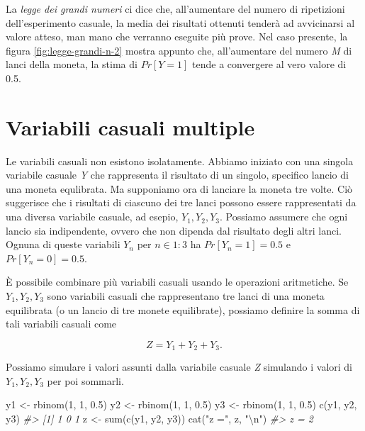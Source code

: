 \documentclass[
  11pt,
]{krantz}
\makeatletter
\newenvironment{Shaded}{\begin{snugshade}}{\end{snugshade}}
\newcommand{\CommentTok}[1]{\textcolor[rgb]{0.37,0.37,0.37}{\textit{#1}}}
\newcommand{\DecValTok}[1]{\textcolor[rgb]{0.06,0.06,0.06}{#1}}
\newcommand{\FloatTok}[1]{\textcolor[rgb]{0.06,0.06,0.06}{#1}}
\newcommand{\FunctionTok}[1]{\textcolor[rgb]{0,0,0}{#1}}
\newcommand{\NormalTok}[1]{#1}
\newcommand{\OtherTok}[1]{\textcolor[rgb]{0.37,0.37,0.37}{#1}}
\newcommand{\SpecialCharTok}[1]{\textcolor[rgb]{0,0,0}{#1}}
\newcommand{\StringTok}[1]{\textcolor[rgb]{0.5,0.5,0.5}{#1}}
\newenvironment{kframe}{%
\medskip{}
\setlength{\fboxsep}{.8em}
 \def\at@end@of@kframe{}%
 \ifinner\ifhmode%
  \def\at@end@of@kframe{\end{minipage}}%
  \begin{minipage}{\columnwidth}%
 \fi\fi%
 \def\FrameCommand##1{\hskip\@totalleftmargin \hskip-\fboxsep
 \colorbox{shadecolor}{##1}\hskip-\fboxsep
     \hskip-\linewidth \hskip-\@totalleftmargin \hskip\columnwidth}%
 \MakeFramed {\advance\hsize-\width
   \@totalleftmargin\z@ \linewidth\hsize
   \@setminipage}}%
 {\par\unskip\endMakeFramed%
 \at@end@of@kframe}
\renewenvironment{Shaded}{\begin{kframe}}{\end{kframe}}
\theoremstyle{definition}
\theoremstyle{definition}
\theoremstyle{definition}
\theoremstyle{definition}
\theoremstyle{remark}
\makeatother
\begin{document}
La \emph{legge dei grandi numeri} ci dice che, all'aumentare del numero di ripetizioni dell'esperimento casuale, la media dei risultati ottenuti tenderà ad avvicinarsi al valore atteso, man mano che verranno eseguite più prove. Nel caso presente, la figura \ref{fig:legge-grandi-n-2} mostra appunto che, all'aumentare del numero \emph{M} di lanci della moneta, la stima di \(Pr[Y = 1]\) tende a convergere al vero valore di 0.5.

\hypertarget{variabili-casuali-multiple}{%
\section{Variabili casuali multiple}\label{variabili-casuali-multiple}}

Le variabili casuali non esistono isolatamente. Abbiamo iniziato con una singola variabile casuale \emph{Y} che rappresenta il risultato di un singolo, specifico lancio di una moneta equlibrata. Ma supponiamo ora di lanciare la moneta tre volte. Ciò suggerisce che i risultati di ciascuno dei tre lanci possono essere rappresentati da una diversa variabile casuale, ad esepio, \(Y_1 , Y_2 , Y_3\). Possiamo assumere che ogni lancio sia indipendente, ovvero che non dipenda dal risultato degli altri lanci. Ognuna di queste variabili \(Y_n\) per \(n \in 1:3\) ha \(Pr[Y_n =1]=0.5\) e \(Pr[Y_n =0]=0.5\).

È possibile combinare più variabili casuali usando le operazioni aritmetiche. Se \(Y_1 , Y_2, Y_3\) sono variabili casuali che rappresentano tre lanci di una moneta equilibrata (o un lancio di tre monete equilibrate), possiamo definire la somma di tali variabili casuali come

\[
Z = Y_1 + Y_2 + Y_3.
\]

Possiamo simulare i valori assunti dalla variabile casuale \emph{Z} simulando i valori di \(Y_1, Y_2, Y_3\) per poi sommarli.

\begin{Shaded}
\begin{Highlighting}[]
\NormalTok{y1 }\OtherTok{\textless{}{-}} \FunctionTok{rbinom}\NormalTok{(}\DecValTok{1}\NormalTok{, }\DecValTok{1}\NormalTok{, }\FloatTok{0.5}\NormalTok{)}
\NormalTok{y2 }\OtherTok{\textless{}{-}} \FunctionTok{rbinom}\NormalTok{(}\DecValTok{1}\NormalTok{, }\DecValTok{1}\NormalTok{, }\FloatTok{0.5}\NormalTok{)}
\NormalTok{y3 }\OtherTok{\textless{}{-}} \FunctionTok{rbinom}\NormalTok{(}\DecValTok{1}\NormalTok{, }\DecValTok{1}\NormalTok{, }\FloatTok{0.5}\NormalTok{)}
\FunctionTok{c}\NormalTok{(y1, y2, y3)}
\CommentTok{\#\textgreater{} [1] 1 0 1}
\NormalTok{z }\OtherTok{\textless{}{-}} \FunctionTok{sum}\NormalTok{(}\FunctionTok{c}\NormalTok{(y1, y2, y3))}
\FunctionTok{cat}\NormalTok{(}\StringTok{"z ="}\NormalTok{, z, }\StringTok{"}\SpecialCharTok{\textbackslash{}n}\StringTok{"}\NormalTok{)}
\CommentTok{\#\textgreater{} z = 2}
\end{Highlighting}
\end{Shaded}
\end{document}
